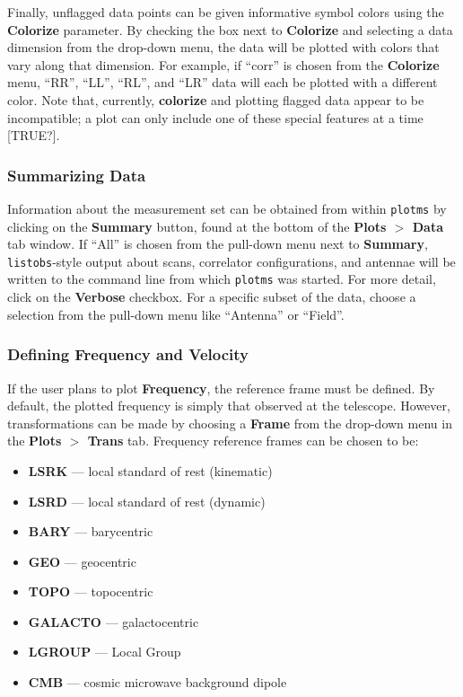 Finally, unflagged data points can be given informative symbol colors using the {\bf Colorize} parameter. By checking the box next to {\bf Colorize} and selecting a data dimension from the drop-down menu, the data will be plotted with colors that vary along that dimension. For example, if ``corr'' is chosen from the {\bf Colorize} menu, ``RR'', ``LL'', ``RL'', and ``LR'' data will each be plotted with a different color. Note that, currently, {\bf colorize} and plotting flagged data appear to be incompatible; a plot can only include one of these special features at a time [TRUE?].


\subsubsection{Summarizing Data}
\label{section:edit.plot.plotms.summary}

Information about the measurement set can be obtained from within {\tt plotms} by clicking on the {\bf Summary} button, found at the bottom of the {\bf Plots $>$ Data} tab window. If ``All'' is chosen from the pull-down menu next to {\bf Summary}, {\tt listobs}-style output about scans, correlator configurations, and antennae will be written to the command line from which {\tt plotms} was started. For more detail, click on the {\bf Verbose} checkbox. For a specific subset of the data, choose a selection from the pull-down menu like ``Antenna'' or ``Field''.


\subsubsection{Defining Frequency and Velocity}
\label{section:edit.plot.plotms.trans}

If the user plans to plot {\bf Frequency}, the reference frame must be defined. By default, the plotted frequency is simply that observed at the telescope. However, transformations can be made by choosing a {\bf Frame} from the drop-down menu in the {\bf Plots $>$ Trans} tab. Frequency reference frames can be chosen to be:
\begin{itemize}
\item {\bf LSRK} --- local standard of rest (kinematic)
\item {\bf LSRD} --- local standard of rest (dynamic)
\item {\bf BARY} --- barycentric
\item {\bf GEO} --- geocentric
\item {\bf TOPO} --- topocentric
\item {\bf GALACTO} --- galactocentric
\item {\bf LGROUP} --- Local Group
\item {\bf CMB} --- cosmic microwave background dipole
\end{itemize}

